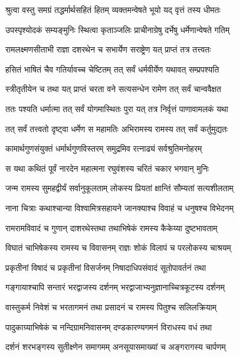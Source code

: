 
\twolineshloka
{श्रुत्वा वस्तु समग्रं तद्धर्मार्थसहितं हितम्}
{व्यक्तमन्वेषते भूयो यद् वृत्तं तस्य धीमतः} %

\twolineshloka
{उपस्पृश्योदकं सम्यङ्मुनिः स्थित्वा कृताञ्जलिः}
{प्राचीनाग्रेषु दर्भेषु धर्मेणान्वेषते गतिम्} %

\twolineshloka
{रामलक्ष्मणसीताभी राज्ञा दशरथेन च}
{सभार्येण सराष्ट्रेण यत् प्राप्तं तत्र तत्त्वतः} %

\twolineshloka
{हसितं भाषितं चैव गतिर्यावच्च चेष्टितम्}
{तत् सर्वं धर्मवीर्येण यथावत् सम्प्रपश्यति} %

\twolineshloka
{स्त्रीतृतीयेन च तथा यत् प्राप्तं चरता वने}
{सत्यसन्धेन रामेण तत् सर्वं चान्ववैक्षत} %

\twolineshloka
{ततः पश्यति धर्मात्मा तत् सर्वं योगमास्थितः}
{पुरा यत् तत्र निर्वृत्तं पाणावामलकं यथा} %

\twolineshloka
{तत् सर्वं तत्त्वतो दृष्ट्वा धर्मेण स महामतिः}
{अभिरामस्य रामस्य तत् सर्वं कर्तुमुद्यतः} %

\twolineshloka
{कामार्थगुणसंयुक्तं धर्मार्थगुणविस्तरम्}
{समुद्रमिव रत्नाढ्यं सर्वश्रुतिमनोहरम्} %

\twolineshloka
{स यथा कथितं पूर्वं नारदेन महात्मना}
{रघुवंशस्य चरितं चकार भगवान् मुनिः} %

\twolineshloka
{जन्म रामस्य सुमहद्वीर्यं सर्वानुकूलताम्}
{लोकस्य प्रियतां क्षान्तिं सौम्यतां सत्यशीलताम्} %

\twolineshloka
{नाना चित्राः कथाश्चान्या विश्वामित्रसहायने}
{जानक्याश्च विवाहं च धनुषश्च विभेदनम्} %

\twolineshloka
{रामरामविवादं च गुणान् दाशरथेस्तथा}
{तथाभिषेकं रामस्य कैकेय्या दुष्टभावताम्} %

\twolineshloka
{विघातं चाभिषेकस्य रामस्य च विवासनम्}
{राज्ञः शोकं विलापं च परलोकस्य चाश्रयम्} %

\twolineshloka
{प्रकृतीनां विषादं च प्रकृतीनां विसर्जनम्}
{निषादाधिपसंवादं सूतोपावर्तनं तथा} %

\twolineshloka
{गङ्गायाश्चापि सन्तारं भरद्वाजस्य दर्शनम्}
{भरद्वाजाभ्यनुज्ञानाच्चित्रकूटस्य दर्शनम्} %

\twolineshloka
{वास्तुकर्म निवेशं च भरतागमनं तथा}
{प्रसादनं च रामस्य पितुश्च सलिलक्रियाम्} %

\twolineshloka
{पादुकाग्र्याभिषेकं च नन्दिग्रामनिवासनम्}
{दण्डकारण्यगमनं विराधस्य वधं तथा} %

\twolineshloka
{दर्शनं शरभङ्गस्य सुतीक्ष्णेन समागमम्}
{अनसूयासमाख्यां च अङ्गरागस्य चार्पणम्} %


